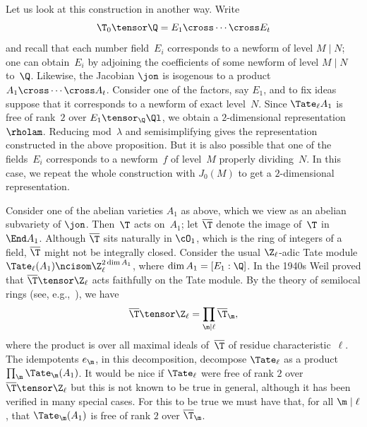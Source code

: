 \documentclass{report}
\begin{document}
Let us look at this construction in another way. Write
$$\T_0\tensor\Q=E_1\cross\cdots\cross E_t$$
and recall that each number field~$E_i$
corresponds to a newform of level
$M\mid N$; one can obtain~$E_i$
by adjoining the coefficients of
some newform of level $M\mid N$ to~$\Q$.
Likewise, the Jacobian
$\jon$ is isogenous to a product $A_1\cross\cdots\cross A_t$.
Consider
one of the factors, say $E_1$, and to fix ideas suppose
that it corresponds to a newform of exact level~$N$. Since
$\Tate_{\ell}A_1$ is free of rank~$2$ over
$E_1\tensor_{\Q}\Ql$, we obtain a $2$-dimensional
representation~$\rholam$. Reducing mod~$\lambda$ and semisimplifying gives
the representation constructed in the above proposition.
But it is also possible that one of the fields~$E_i$
corresponds to a newform~$f$ of level~$M$ properly dividing~$N$.
In this case, we repeat the whole construction with $J_0(M)$
to get a $2$-dimensional representation.

Consider one of the abelian varieties $A_1$ as above,
which we view as an abelian  subvariety of $\jon$.
Then~$\T$ acts on~$A_1$; let $\overline{\T}$
denote the image of~$\T$ in $\End A_1$.
Although $\overline{\T}$ sits naturally in
$\cO_1$, which is the ring of integers of a field,
$\overline{\T}$ might not be integrally closed. Consider
the usual $\Z_{\ell}$-adic Tate module
$\Tate_{\ell}(A_1)\ncisom\Z_{\ell}^{2\dim A_1}$, where
$\dim A_1=[E_1:\Q]$.
In the 1940s Weil proved that
$\overline{\T}\tensor \Z_{\ell}$
acts  faithfully on the Tate module.
By the theory of semilocal rings
(see, e.g.,~\cite[Cor.~7.6]{eisenbud}), we have
$$\overline{\T}\tensor\Z_{\ell}
 =\prod_{\m \mid \ell}\overline{\T}_{\m},$$
where the product is over all maximal ideals of~$\overline{\T}$ of
residue characteristic~$\ell$.
The idempotents $e_\m$, in this decomposition, decompose $\Tate_\ell$
as a product $\prod_{\m}\Tate_{\m}(A_1)$.
It would be nice if $\Tate_{\ell}$ were free of
rank $2$ over $\overline{\T}\tensor\Z_{\ell}$ but
this is not known to be true in general, although
it has been verified in many special cases. For this to be
true we must have that, for all $\m\mid \ell$, that
$\Tate_{\m}(A_1)$ is free of rank $2$ over $\overline{\T}_\m$.
\end{document}
